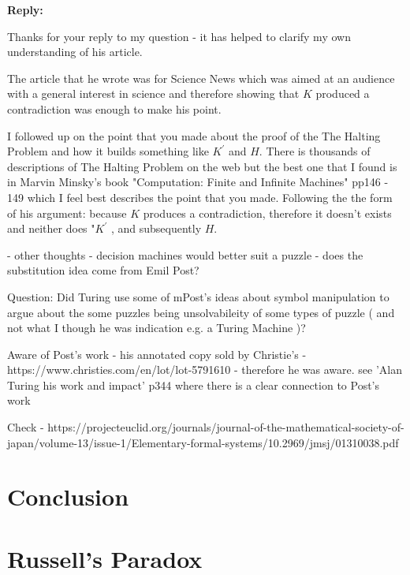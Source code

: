 \documentclass{article}[12pt]
\begin{document}
\noindent

\textbf{Reply:}

Thanks for your reply to my question - it has helped to clarify my own understanding of his article. 

The article that he wrote was for Science News which was aimed at an audience with a general interest in science and therefore showing that $K$ produced a contradiction was enough to make his point.

I followed up on the point that you made about the proof of the The Halting Problem and how it builds something like $K^\prime$ and $H$. There is thousands of descriptions of The Halting Problem on the web but the best one that I found is in Marvin Minsky's book "Computation: Finite and Infinite Machines" pp146 - 149 which I feel best describes the point that you made.  Following the the form of his argument: because $K$ produces a contradiction, therefore it doesn't exists and neither does "$K^\prime$ , and subsequently $H$. 



\noindent - other thoughts - decision machines would better suit a puzzle - does the substitution idea come from Emil Post?

\noindent

Question: Did Turing use some of mPost’s ideas about symbol manipulation to argue about the some puzzles being unsolvabileity of some types of puzzle ( and not what I though he was indication e.g. a Turing Machine )?

Aware of Post’s work - his annotated copy sold by Christie’s - https://www.christies.com/en/lot/lot-5791610 - therefore he was aware.  see 'Alan Turing his work and impact' p344 where there is a clear connection to Post's work

Check - https://projecteuclid.org/journals/journal-of-the-mathematical-society-of-japan/volume-13/issue-1/Elementary-formal-systems/10.2969/jmsj/01310038.pdf


\section*{Conclusion}


\appendix
\section{ Russell's Paradox} \label{A:Russell's Paradox}
\end{document}
